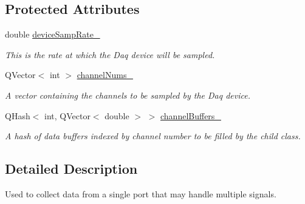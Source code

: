 \subsection*{Protected Attributes}
\begin{DoxyCompactItemize}
\item 
\hypertarget{class_picto_1_1_input_port_ab903e1969d02f8ec9f7644b302b224c1}{double \hyperlink{class_picto_1_1_input_port_ab903e1969d02f8ec9f7644b302b224c1}{device\-Samp\-Rate\-\_\-}}\label{class_picto_1_1_input_port_ab903e1969d02f8ec9f7644b302b224c1}

\begin{DoxyCompactList}\small\item\em This is the rate at which the Daq device will be sampled. \end{DoxyCompactList}\item 
\hypertarget{class_picto_1_1_input_port_af7fd054102d952d0c77724715be1b686}{Q\-Vector$<$ int $>$ \hyperlink{class_picto_1_1_input_port_af7fd054102d952d0c77724715be1b686}{channel\-Nums\-\_\-}}\label{class_picto_1_1_input_port_af7fd054102d952d0c77724715be1b686}

\begin{DoxyCompactList}\small\item\em A vector containing the channels to be sampled by the Daq device. \end{DoxyCompactList}\item 
\hypertarget{class_picto_1_1_input_port_a09aff384b2a6d499f824a1cbb9f7746a}{Q\-Hash$<$ int, Q\-Vector$<$ double $>$ $>$ \hyperlink{class_picto_1_1_input_port_a09aff384b2a6d499f824a1cbb9f7746a}{channel\-Buffers\-\_\-}}\label{class_picto_1_1_input_port_a09aff384b2a6d499f824a1cbb9f7746a}

\begin{DoxyCompactList}\small\item\em A hash of data buffers indexed by channel number to be filled by the child class. \end{DoxyCompactList}\end{DoxyCompactItemize}


\subsection{Detailed Description}
Used to collect data from a single port that may handle multiple signals. 

